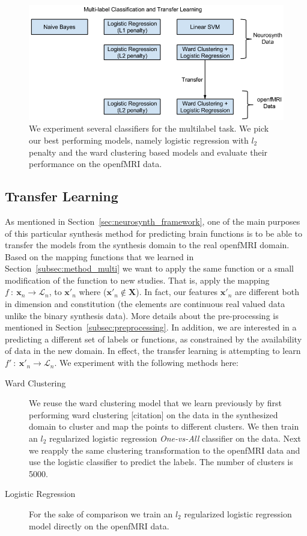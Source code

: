 \documentclass{article} %
\begin{document}
\begin{figure}[ht]
\vspace{-0.5cm}
\centering
\includegraphics[scale=0.5]{./figs/multilabel_transfer.png}
\caption{We experiment several classifiers for the multilabel task. We pick our best performing models, namely logistic regression with $l_2$ penalty and the ward clustering based models and evaluate their performance on the openfMRI data. }
\end{figure}

 \subsection{Transfer Learning}
 As mentioned in Section~\ref{sec:neurosynth_framework}, one of the main purposes of this particular synthesis method for predicting brain functions is to be able to transfer the models from the synthesis domain to the real openfMRI domain. Based on the mapping functions that we learned in Section~\ref{subsec:method_multi} we want to apply the same function or a small modification of the function to new studies. That is, apply the mapping $f\ :\ \mathbf{x}_n \rightarrow \mathcal{L}_n$, to $\mathbf{x}'_n$ where ($\mathbf{x}'_n \notin \mathbf{X}$). In fact, our features $\mathbf{x}'_n$ are different both in dimension and constitution (the elements are continuous real valued data unlike the binary synthesis data). More details about the pre-processing is mentioned in Section~\ref{subsec:preprocessing}. In addition, we are interested in a predicting a different set of labels or functions, as constrained by the availability of data in the new domain. In effect, the transfer learning is attempting to learn $f'\ :\ \mathbf{x}'_n \rightarrow \mathcal{L}_n$. We experiment with the following methods here:
  \begin{description}
  \item[Ward Clustering] We reuse the ward clustering model that we learn previously by first performing ward clustering [citation] on the data in the synthesized domain to cluster and map the points to different clusters. We then train an $l_2$ regularized logistic regression \textit{One-vs-All} classifier on the data. Next we reapply the same clustering transformation to the openfMRI data and use the logistic classifier to predict the labels. The number of clusters is 5000.
  \item[Logistic Regression] For the sake of comparison we train an $l_2$ regularized logistic regression model directly on the openfMRI data.
  \end{description}
\end{document}
